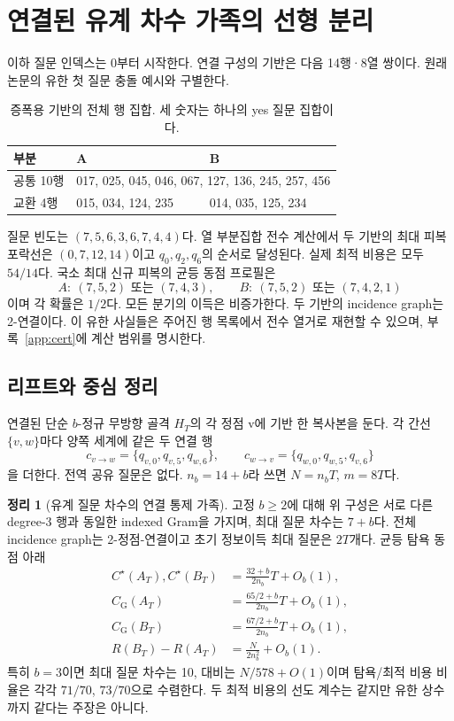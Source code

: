 \documentclass[11pt,a4paper]{article}
\theoremstyle{definition}
\newtheorem{theorem}{정리}
\theoremstyle{remark}\newtheorem{remark}[theorem]{주석}
\newcommand{\Opt}{C^{\star}}
\newcommand{\Greedy}{C_{\mathrm G}}
\newcommand{\Reg}{R}
\begin{document}
\section{연결된 유계 차수 가족의 선형 분리}\label{sec:theory}
이하 질문 인덱스는 0부터 시작한다. 연결 구성의 기반은 다음 14행·8열 쌍이다. 원래 논문의 유한 첫 질문 충돌 예시와 구별한다.
\begin{table}[htbp]\centering\small
\caption{증폭용 기반의 전체 행 집합. 세 숫자는 하나의 yes 질문 집합이다.}\label{tab:base}
\begin{tabular}{lll}\toprule
부분&A&B\\\midrule
공통 10행&\multicolumn{2}{l}{017, 025, 045, 046, 067, 127, 136, 245, 257, 456}\\
교환 4행&015, 034, 124, 235&014, 035, 125, 234\\\bottomrule
\end{tabular}
\end{table}
질문 빈도는 $(7,5,6,3,6,7,4,4)$다. 열 부분집합 전수 계산에서 두 기반의 최대 피복 포락선은 $(0,7,12,14)$이고 $q_0,q_2,q_6$의 순서로 달성된다. 실제 최적 비용은 모두 $54/14$다. 국소 최대 신규 피복의 균등 동점 프로필은
\begin{equation}\label{eq:profiles}
 A:\ (7,5,2)\text{ 또는 }(7,4,3),\qquad
 B:\ (7,5,2)\text{ 또는 }(7,4,2,1)
\end{equation}
이며 각 확률은 $1/2$다. 모든 분기의 이득은 비증가한다. 두 기반의 incidence graph는 2-연결이다. 이 유한 사실들은 주어진 행 목록에서 전수 열거로 재현할 수 있으며, 부록~\ref{app:cert}에 계산 범위를 명시한다.

\subsection{리프트와 중심 정리}
연결된 단순 $b$-정규 무방향 골격 $H_T$의 각 정점 v에 기반 한 복사본을 둔다. 각 간선 $\{v,w\}$마다 양쪽 세계에 같은 두 연결 행
\begin{equation}\label{eq:connector}
 c_{v\to w}=\{q_{v,0},q_{v,5},q_{w,6}\},\qquad
 c_{w\to v}=\{q_{w,0},q_{w,5},q_{v,6}\}
\end{equation}
을 더한다. 전역 공유 질문은 없다. $n_b=14+b$라 쓰면 $N=n_bT$, $m=8T$다.

\begin{theorem}[유계 질문 차수의 연결 통제 가족]\label{thm:main}
고정 $b\ge2$에 대해 위 구성은 서로 다른 degree-3 행과 동일한 indexed Gram을 가지며, 최대 질문 차수는 $7+b$다. 전체 incidence graph는 2-정점-연결이고 초기 정보이득 최대 질문은 $2T$개다. 균등 탐욕 동점 아래
\begin{align}
 \Opt(A_T),\Opt(B_T)&=\frac{32+b}{2n_b}T+O_b(1),\label{eq:optlead}\\
 \Greedy(A_T)&=\frac{65/2+b}{2n_b}T+O_b(1),\\
 \Greedy(B_T)&=\frac{67/2+b}{2n_b}T+O_b(1),\\
 \Reg(B_T)-\Reg(A_T)&=\frac{N}{2n_b^2}+O_b(1).\label{eq:contrast}
\end{align}
특히 $b=3$이면 최대 질문 차수는 10, 대비는 $N/578+O(1)$이며 탐욕/최적 비용 비율은 각각 $71/70$, $73/70$으로 수렴한다. 두 최적 비용의 선도 계수는 같지만 유한 상수까지 같다는 주장은 아니다.
\end{theorem}
\end{document}
